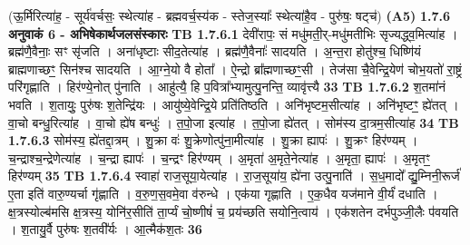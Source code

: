 \documentclass[17pt]{extarticle}
\begin{document}
                  \newline
                                    (ऊ॒र्मिरित्या॑ह॒ - सूर्य॑वर्चसः॒ स्थेत्या॑ह - ब्रह्मवर्च॒स्य॑क - स्तेज॒स्याः᳚ स्थेत्या॑है॒व - पुरु॑षः॒ षट्च॑) \textbf{(A5)} \newline \newline
                \textbf{ 1.7.6     अनुवाकं   6 - अभिषेकार्थजलसंस्कारः} \newline
                                \textbf{ TB 1.7.6.1} \newline
                  देवी॑रापः॒ सं मधु॑मती॒र्-मधु॑मतीभिः सृज्यद्ध्व॒मित्या॑ह । ब्रह्म॑णै॒वैनाः॒ सꣳ सृ॑जति । अना॑धृष्टाः सीद॒तेत्या॑ह । ब्रह्म॑णै॒वैनाः᳚ सादयति । अ॒न्त॒रा होतु॑श्च॒ धिष्णि॑यं ब्राह्मणाच्छꣳ॒॒ सिन॑श्च सादयति । आ॒ग्ने॒यो वै होता᳚ । ऐ॒न्द्रो ब्रा᳚ह्मणाच्छꣳ॒॒सी । तेज॑सा चै॒वेन्द्रि॒येण॑ चोभ॒यतो॑ रा॒ष्ट्रं परि॑गृह्णाति । हिर॑ण्ये॒नोत् पु॑नाति । आहु॑त्यै॒ हि प॒वित्रा᳚भ्यामुत्पु॒नन्ति॒ व्यावृ॑त्त्यै \textbf{ 33} \newline
                  \newline
                                \textbf{ TB 1.7.6.2} \newline
                  श॒तमा॑नं भवति । श॒तायुः॒ पुरु॑षः श॒तेन्द्रि॑यः । आयु॑ष्ये॒वेन्द्रि॒ये प्रति॑तिष्ठति । अनि॑भृष्टम॒सीत्या॑ह । अनि॑भृष्टꣳ॒॒ ह्ये॑तत् । वा॒चो बन्धु॒रित्या॑ह । वा॒चो ह्ये॑ष बन्धुः॑ । त॒पो॒जा इत्या॑ह । त॒पो॒जा ह्ये॑तत् । सोम॑स्य दा॒त्रम॒सीत्या॑ह \textbf{ 34} \newline
                  \newline
                                \textbf{ TB 1.7.6.3} \newline
                  सोम॑स्य॒ ह्ये॑तद्दा॒त्रम् । शु॒क्रा वः॑ शु॒क्रेणोत्पु॑ना॒मीत्या॑ह । शु॒क्रा ह्यापः॑ । शु॒क्रꣳ हिर॑ण्यम् । च॒न्द्राश्च॒न्द्रेणेत्या॑ह । च॒न्द्रा ह्यापः॑ । च॒न्द्रꣳ हिर॑ण्यम् । अ॒मृता॑ अ॒मृते॒नेत्या॑ह । अ॒मृता॒ ह्यापः॑ । अ॒मृतꣳ॒॒ हिर॑ण्यम् \textbf{ 35} \newline
                  \newline
                                \textbf{ TB 1.7.6.4} \newline
                  स्वाहा॑ राज॒सूया॒येत्या॑ह । रा॒ज॒सूया॑य॒ ह्ये॑ना उत्पु॒नाति॑ । स॒ध॒मादो᳚ द्यु॒म्निनी॒रूर्ज॑ ए॒ता इति॑ वारु॒ण्यर्चा गृ॑ह्णाति । व॒रु॒ण॒स॒वमे॒वा व॑रुन्धे । एक॑या गृह्णाति । ए॒क॒धैव यज॑माने वी॒र्यं॑ दधाति । क्ष॒त्रस्योल्ब॑मसि क्ष॒त्रस्य॒ योनि॑र॒सीति॑ ता॒र्प्यं चो॒ष्णीषं॑ च॒ प्रय॑च्छति सयोनि॒त्वाय॑ । एक॑शतेन दर्भपुञ्जी॒लैः प॑वयति । श॒तायु॒र्वै पुरु॑षः श॒तवी᳚र्यः । आ॒त्मैक॑श॒तः \textbf{ 36} \newline
\end{document}
